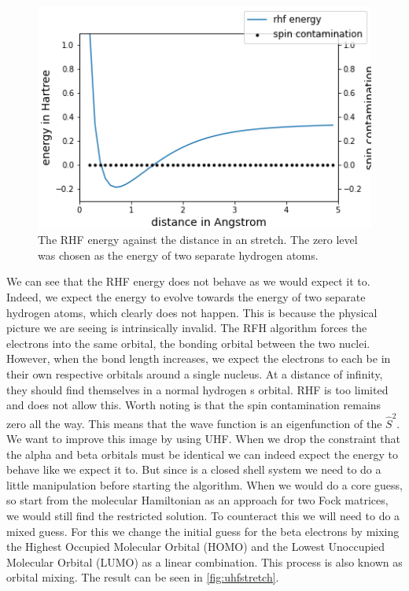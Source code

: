 \documentclass[twoside,twocolumn,9pt]{article}
\begin{document}
\begin{center}
  \begin{figure}[h]
    \includegraphics[width=\linewidth]{./../notes/figures/rhf.png}
    \caption{The RHF energy against the distance in an  stretch. The zero level was chosen as the energy of two separate hydrogen atoms.}
    \label{fig:rhfstretch}
  \end{figure}
\end{center}

We can see that the RHF energy does not behave as we would expect it to. Indeed, we expect the energy to evolve towards the energy of two separate hydrogen atoms, which clearly does
not happen. This is because the physical picture we are seeing is intrinsically invalid. The RFH algorithm forces the electrons into the same orbital, the bonding orbital between
the two nuclei. However, when the bond length increases, we expect the electrons to each be in their own respective orbitals around a single nucleus. At a distance of infinity, they
should find themselves in a normal hydrogen s orbital. RHF is too limited and does not allow this. Worth noting is that the spin contamination remains zero all the way. This means
that the wave function is an eigenfunction of the $\hat{S}^2$\cite{Scuseria2011}. \\
We want to improve this image by using UHF.  When we drop the constraint that the alpha and beta orbitals must be identical we can indeed expect the energy to behave like we expect
it to. But since  is a closed shell system we need to do a little manipulation before starting the algorithm. When we would do a core guess, so start from the molecular
Hamiltonian as an approach for two Fock matrices, we would still find the restricted solution. To counteract this we will need to do a mixed guess. For this we change the initial
guess for the beta electrons by mixing the Highest Occupied Molecular Orbital (HOMO) and the Lowest Unoccupied Molecular Orbital (LUMO) as a linear combination. This process is also
known as orbital mixing. The result can be seen in \ref{fig:uhfstretch}.
\end{document}

